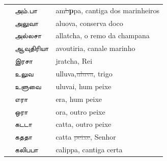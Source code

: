 \documentclass[12pt,a4paper]{scrbook}
\begin{document}
      
\begin{tabular}{lll}
    
        
           &
          அம்.பா &
          am\sout{\textcolor{gray}{b}}\textbf{p}pa, cantiga dos 
		marinheiros \\
    
        
    
        
           &
          அலுவா &
          aluova, conserva doco \\
    
        
    
        
           &
          அல்லசா &
          allatcha, o remo da champana \\
    
        
    
        
           &
          ஆவுதிரியா &
          avoutiria, canale marinho \\
    
        
    
        
           &
          இரசா &
          jratcha, Rei \\
    
        
    
        
           &
          உலுவ &
          ulluva,\sout{\textcolor{gray}{uluva}}, trigo \\
    
        
    
        
           &
          உளுவை &
          uluvai, hum peixe \\
    
        
    
        
           &
          எரா &
          era, hum peixe \\
    
        
    
        
           &
          ஒரா &
          ora, outro peixe \\
    
        
    
        
           &
          கடடா &
          catta, outro peixe \\
    
        
    
        
           &
          கததா &
          catta \sout{\textcolor{gray}{peixe}}, Senhor \\
    
        
    
        
           &
          கலிபபா &
          calippa, cantiga certa \\
    

\end{tabular}
\end{document}
